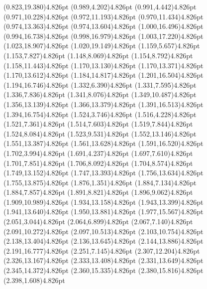 \documentclass[10pt]{article}
\begin{document}
{{\qdisk(0.823,19.380){4.826pt}%
\qdisk(0.989,4.202){4.826pt}%
\qdisk(0.991,4.442){4.826pt}%
\qdisk(0.971,10.228){4.826pt}%
\qdisk(0.972,11.193){4.826pt}%
\qdisk(0.970,11.434){4.826pt}%
\qdisk(0.974,13.363){4.826pt}%
\qdisk(0.974,13.604){4.826pt}%
\qdisk(1.000,16.496){4.826pt}%
\qdisk(0.994,16.738){4.826pt}%
\qdisk(0.998,16.979){4.826pt}%
\qdisk(1.003,17.220){4.826pt}%
\qdisk(1.023,18.907){4.826pt}%
\qdisk(1.020,19.149){4.826pt}%
\qdisk(1.159,5.657){4.826pt}%
\qdisk(1.153,7.827){4.826pt}%
\qdisk(1.148,8.069){4.826pt}%
\qdisk(1.154,8.792){4.826pt}%
\qdisk(1.158,11.443){4.826pt}%
\qdisk(1.170,13.130){4.826pt}%
\qdisk(1.170,13.371){4.826pt}%
\qdisk(1.170,13.612){4.826pt}%
\qdisk(1.184,14.817){4.826pt}%
\qdisk(1.201,16.504){4.826pt}%
\qdisk(1.194,16.746){4.826pt}%
\qdisk(1.332,6.390){4.826pt}%
\qdisk(1.331,7.595){4.826pt}%
\qdisk(1.336,7.836){4.826pt}%
\qdisk(1.341,8.076){4.826pt}%
\qdisk(1.349,10.487){4.826pt}%
\qdisk(1.356,13.139){4.826pt}%
\qdisk(1.366,13.379){4.826pt}%
\qdisk(1.391,16.513){4.826pt}%
\qdisk(1.394,16.754){4.826pt}%
\qdisk(1.524,3.746){4.826pt}%
\qdisk(1.516,4.228){4.826pt}%
\qdisk(1.521,7.361){4.826pt}%
\qdisk(1.514,7.603){4.826pt}%
\qdisk(1.519,7.844){4.826pt}%
\qdisk(1.524,8.084){4.826pt}%
\qdisk(1.523,9.531){4.826pt}%
\qdisk(1.552,13.146){4.826pt}%
\qdisk(1.551,13.387){4.826pt}%
\qdisk(1.561,13.628){4.826pt}%
\qdisk(1.591,16.520){4.826pt}%
\qdisk(1.702,3.994){4.826pt}%
\qdisk(1.691,4.237){4.826pt}%
\qdisk(1.697,7.610){4.826pt}%
\qdisk(1.701,7.851){4.826pt}%
\qdisk(1.706,8.092){4.826pt}%
\qdisk(1.704,8.574){4.826pt}%
\qdisk(1.749,13.152){4.826pt}%
\qdisk(1.747,13.393){4.826pt}%
\qdisk(1.756,13.634){4.826pt}%
\qdisk(1.755,13.875){4.826pt}%
\qdisk(1.876,1.351){4.826pt}%
\qdisk(1.884,7.134){4.826pt}%
\qdisk(1.884,7.857){4.826pt}%
\qdisk(1.891,8.821){4.826pt}%
\qdisk(1.896,9.062){4.826pt}%
\qdisk(1.909,10.989){4.826pt}%
\qdisk(1.934,13.158){4.826pt}%
\qdisk(1.943,13.399){4.826pt}%
\qdisk(1.941,13.640){4.826pt}%
\qdisk(1.950,13.881){4.826pt}%
\qdisk(1.977,15.567){4.826pt}%
\qdisk(2.051,3.044){4.826pt}%
\qdisk(2.064,6.899){4.826pt}%
\qdisk(2.067,7.140){4.826pt}%
\qdisk(2.091,10.272){4.826pt}%
\qdisk(2.097,10.513){4.826pt}%
\qdisk(2.103,10.754){4.826pt}%
\qdisk(2.138,13.404){4.826pt}%
\qdisk(2.136,13.645){4.826pt}%
\qdisk(2.144,13.886){4.826pt}%
\qdisk(2.191,16.777){4.826pt}%
\qdisk(2.251,7.145){4.826pt}%
\qdisk(2.307,12.204){4.826pt}%
\qdisk(2.326,13.167){4.826pt}%
\qdisk(2.333,13.408){4.826pt}%
\qdisk(2.331,13.649){4.826pt}%
\qdisk(2.345,14.372){4.826pt}%
\qdisk(2.360,15.335){4.826pt}%
\qdisk(2.380,15.816){4.826pt}%
\qdisk(2.398,1.608){4.826pt}%
}}
\end{document}
